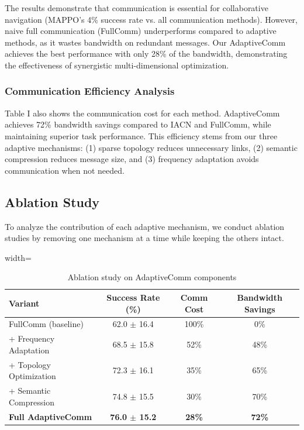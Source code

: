 \documentclass[10pt, twocolumn]{IEEEtran}
\begin{document}
The results demonstrate that communication is essential for collaborative navigation (MAPPO's 4\% success rate vs. all communication methods). However, naive full communication (FullComm) underperforms compared to adaptive methods, as it wastes bandwidth on redundant messages. Our AdaptiveComm achieves the best performance with only 28\% of the bandwidth, demonstrating the effectiveness of synergistic multi-dimensional optimization.

\subsubsection{Communication Efficiency Analysis}
Table I also shows the communication cost for each method. AdaptiveComm achieves 72\% bandwidth savings compared to IACN and FullComm, while maintaining superior task performance. This efficiency stems from our three adaptive mechanisms: (1) sparse topology reduces unnecessary links, (2) semantic compression reduces message size, and (3) frequency adaptation avoids communication when not needed.

\subsection{Ablation Study}
To analyze the contribution of each adaptive mechanism, we conduct ablation studies by removing one mechanism at a time while keeping the others intact.

\begin{table}[h]
\centering
\caption{Ablation study on AdaptiveComm components}
\begin{adjustbox}{width=\columnwidth}
\begin{tabular}{@{}lccc@{}}
\toprule
\textbf{Variant} & \textbf{Success Rate (\%)} & \textbf{Comm Cost} & \textbf{Bandwidth Savings} \\
\midrule
FullComm (baseline) & 62.0 $\pm$ 16.4 & 100\% & 0\% \\
+ Frequency Adaptation & 68.5 $\pm$ 15.8 & 52\% & 48\% \\
+ Topology Optimization & 72.3 $\pm$ 16.1 & 35\% & 65\% \\
+ Semantic Compression & 74.8 $\pm$ 15.5 & 30\% & 70\% \\
\textbf{Full AdaptiveComm} & \textbf{76.0 $\pm$ 15.2} & \textbf{28\%} & \textbf{72\%} \\
\bottomrule
\end{tabular}
\end{adjustbox}
\end{table}
\end{document}
